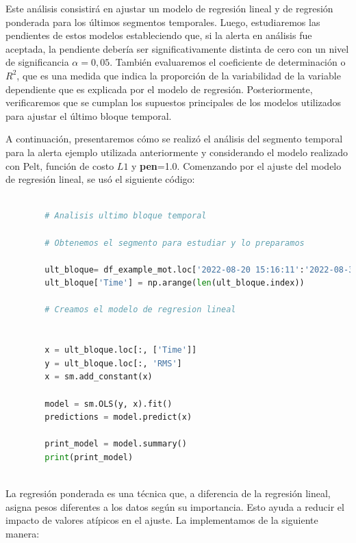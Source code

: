 \documentclass{article}[14pts]
\begin{document}
    Este análisis consistirá en ajustar un modelo de regresión lineal y de regresión ponderada para los últimos segmentos temporales. Luego, estudiaremos las pendientes de estos modelos estableciendo que, si la alerta en análisis fue aceptada, la pendiente debería ser significativamente distinta de cero con un nivel de significancia $\alpha= 0, 05$. También evaluaremos el coeficiente de determinación o $R^{2}$, que es una medida que indica la proporción de la variabilidad de la variable dependiente que es explicada por el modelo de regresión. Posteriormente, verificaremos que se cumplan los supuestos principales de los modelos utilizados para ajustar el último bloque temporal.

    A continuación, presentaremos cómo se realizó el análisis del segmento temporal para la alerta ejemplo utilizada anteriormente y considerando el modelo realizado con Pelt, función de costo $L1$ y \textbf{pen}=1.0. Comenzando por el ajuste del modelo de regresión lineal, se usó el siguiente código:

      \begin{lstlisting}[language= Python]

        # Analisis ultimo bloque temporal

        # Obtenemos el segmento para estudiar y lo preparamos 

        ult_bloque= df_example_mot.loc['2022-08-20 15:16:11':'2022-08-31 07:16:47']
        ult_bloque['Time'] = np.arange(len(ult_bloque.index))

        # Creamos el modelo de regresion lineal


        x = ult_bloque.loc[:, ['Time']] 
        y = ult_bloque.loc[:, 'RMS']  
        x = sm.add_constant(x)

        model = sm.OLS(y, x).fit()
        predictions = model.predict(x) 

        print_model = model.summary()
        print(print_model)
        
      \end{lstlisting}

    La regresión ponderada es una técnica que, a diferencia de la regresión lineal, asigna pesos diferentes a los datos según su importancia. Esto ayuda a reducir el impacto de valores atípicos en el ajuste. La implementamos de la siguiente manera:
\end{document}
